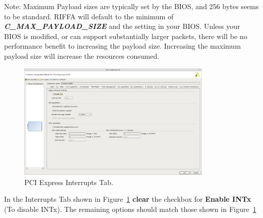\documentclass{refrep}
\newcommand{\ConfigSetting}[1]{\textbf{#1}}
\newcommand{\RIFFAParameter}[1]{\textit{\textbf{#1}}}
\begin{document}
Note: Maximum Payload sizes are typically set by the BIOS, and 256 bytes seems
to be standard. RIFFA will default to the minimum of
\RIFFAParameter{C\_MAX\_PAYLOAD\_SIZE} and the setting in your BIOS. Unless your
BIOS is modified, or can support substantially larger packets, there will be no
performance benefit to increasing the payload size. Increasing the maximum
payload size will increase the resources consumed.

\begin{figure}[H]
  \includegraphics[width=350px,center]{7SeriesIntegratedTabInterrupts.png}
  \caption{PCI Express Interrupts Tab.}
  \label{Fig:7SeriesIntegrated:Generating:7SeriesIntegratedTabInterrupts}
\end{figure}
In the Interrupts Tab shown in
Figure~\ref{Fig:7SeriesIntegrated:Generating:7SeriesIntegratedTabInterrupts}
\ConfigSetting{clear} the checkbox for \ConfigSetting{Enable INTx} (To disable
INTx). The remaining options should match those shown in
Figure~\ref{Fig:7SeriesIntegrated:Generating:7SeriesIntegratedTabInterrupts}
\end{document}
